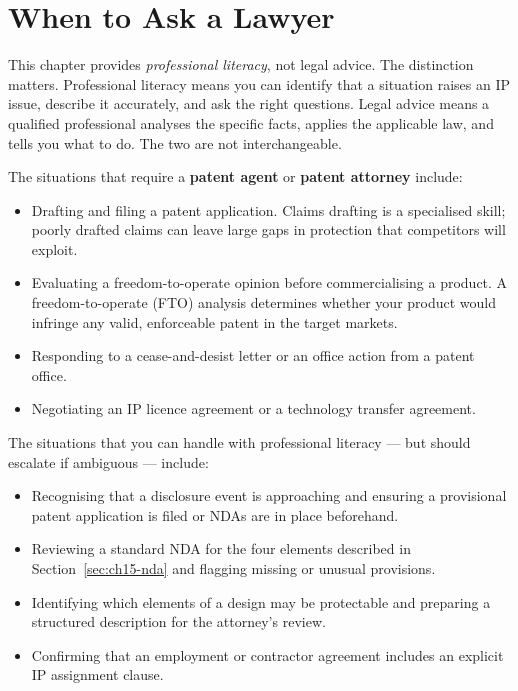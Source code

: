 \section{When to Ask a Lawyer}
\label{sec:ch15-lawyer}

This chapter provides
\emph{professional literacy}, not legal advice.
The distinction matters.
Professional literacy means you can identify that a situation raises an IP issue,
describe it accurately, and ask the right questions.
Legal advice means a qualified professional analyses the specific facts, applies
the applicable law, and tells you what to do.
The two are not interchangeable.

The situations that require a \textbf{patent agent} or \textbf{patent attorney}
include:
\begin{itemize}
  \item Drafting and filing a patent application.
        Claims drafting is a specialised skill; poorly drafted claims can leave
        large gaps in protection that competitors will exploit.
  \item Evaluating a freedom-to-operate opinion before commercialising a product.
        A freedom-to-operate (FTO) analysis determines whether your product would
        infringe any valid, enforceable patent in the target markets.
  \item Responding to a cease-and-desist letter or an office action from a
        patent office.
  \item Negotiating an IP licence agreement or a technology transfer agreement.
\end{itemize}

The situations that you can handle with professional literacy --- but should
escalate if ambiguous --- include:
\begin{itemize}
  \item Recognising that a disclosure event is approaching and ensuring a
        provisional patent application is filed or NDAs are in place beforehand.
  \item Reviewing a standard NDA for the four elements described in
        Section~\ref{sec:ch15-nda} and flagging missing or unusual provisions.
  \item Identifying which elements of a design may be protectable and preparing
        a structured description for the attorney's review.
  \item Confirming that an employment or contractor agreement includes an explicit
        IP assignment clause.
\end{itemize}

